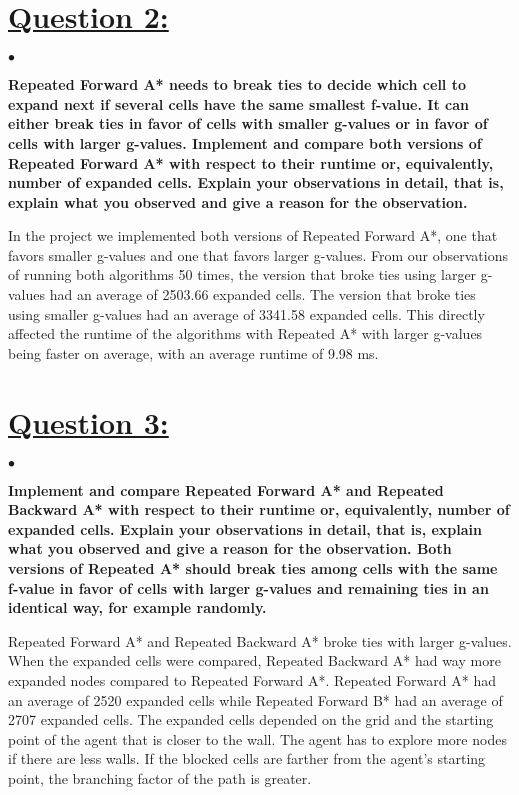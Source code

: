 \documentclass{article}
\begin{document}
\newpage
\section{\underline{Question 2:}}
$\bullet$ {\large \textbf{Repeated Forward A* needs to break ties to decide which cell to expand next if several cells have the same smallest f-value. It can either break ties in favor of cells with smaller g-values or in favor of cells with larger g-values. Implement and compare both versions of Repeated Forward A* with respect to their runtime or, equivalently, number of expanded cells. Explain your observations in detail, that is, explain what you observed and give a reason for the observation.}\\\par}
{\large In the project we implemented both versions of Repeated Forward A*, one that favors smaller g-values and one that favors larger g-values. From our observations of running both algorithms 50 times, the version that broke ties using larger g-values had an average of 2503.66 expanded cells. The version that broke ties using smaller g-values had an average of 3341.58 expanded cells. This directly affected the runtime of the algorithms with Repeated A* with larger g-values being faster on average, with an average runtime of 9.98 ms.}\\
\section{\underline{Question 3:}}
$\bullet$ {\large \textbf{Implement and compare Repeated Forward A* and Repeated Backward A* with respect to their runtime or, equivalently, number of expanded cells. Explain your observations in detail, that is, explain what you observed and give a reason for the observation. Both versions of Repeated A* should break ties among cells with the same f-value in favor of cells with larger g-values and remaining ties in an identical way, for example randomly.}\\\par}
{\large Repeated Forward A* and Repeated Backward A* broke ties with larger g-values. When the expanded cells were compared, Repeated Backward A* had way more expanded nodes compared to Repeated Forward A*. Repeated Forward A* had an average of 2520 expanded cells while Repeated Forward B* had an average of 2707 expanded cells. The expanded cells depended on the grid and the starting point of the agent that is closer to the wall. The agent has to explore more nodes if there are less walls. If the blocked cells are farther from the agent’s starting point, the branching factor of the path is greater.}\\
\end{document}
